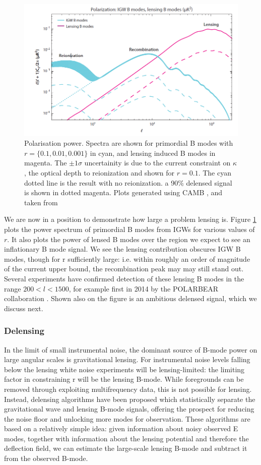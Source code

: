 \documentclass[a4paper,10pt]{article}
\begin{document}
\begin{figure}[h]
  \includegraphics[width=0.7\linewidth]{lensingfucksus.png}
  \centering
  \caption{Polarisation power. Spectra are shown for primordial B modes with $r=\{0.1,0.01,0.001\}$ in cyan, and lensing induced B modes in magenta. The $\pm1\sigma$ uncertainity is due to the current constraint on $\kappa$, the optical depth to reionization and shown for $r=0.1$. The cyan dotted line is the result with no reionization. a 90\% delensed signal is shown in dotted magenta. Plots generated using CAMB \cite{CAMBInfo}, and taken from \cite{QBM}}
  \label{lensingisfucked}
\end{figure}

We are now in a position to demonstrate how large a problem lensing is. Figure \ref{lensingisfucked} plots the power spectrum of primordial B modes from IGWs for various values of $r$. It also plots the power of lensed B modes over the region we expect to see an inflationary B mode signal. We see the lensing contribution obscures IGW B modes, though for r sufficiently large: i.e. within roughly an order of magnitude of the current upper bound, the recombination peak may may still stand out. Several experiments have confirmed detection of these lensing B modes in the range $200<l<1500$, for example first in 2014 by the POLARBEAR collaboration \cite{polarbear}. Shown also on the figure is an ambitious delensed signal, which we discuss next.

\subsubsection{Delensing}

In the limit of small instrumental noise, the dominant source of B-mode power on large angular scales is gravitational lensing. For instrumental noise levels falling below the lensing white noise experiments will be lensing-limited: the limiting factor in constraining r will be the lensing B-mode. While foregrounds can be removed through exploiting multifrequency data, this is not possible for lensing. Instead, delensing algorithms have been proposed  which statistically separate the gravitational wave and lensing B-mode signals, offering the prospect for reducing the noise floor and unlocking more modes for observation. These algorithms are based on a relatively simple idea: given information about noisy observed E modes, together with information about the lensing potential and therefore the deflection field, we can estimate the large-scale lensing B-mode and subtract it from the observed B-mode.\\
\end{document}
